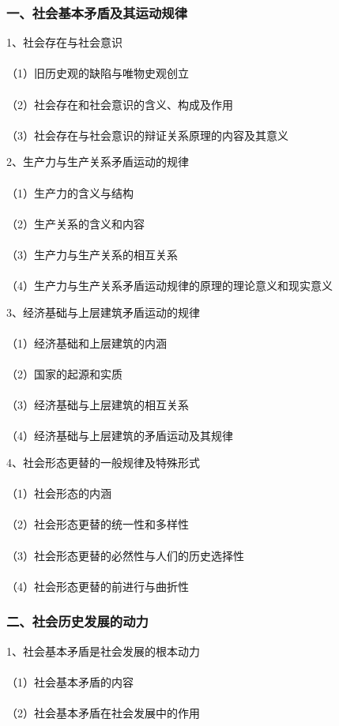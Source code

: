 \documentclass{ctexart}
\begin{document}
\subsubsection{一、社会基本矛盾及其运动规律}
1、社会存在与社会意识
\\\\
（1）旧历史观的缺陷与唯物史观创立
\\\\
（2）社会存在和社会意识的含义、构成及作用
\\\\
（3）社会存在与社会意识的辩证关系原理的内容及其意义

2、生产力与生产关系矛盾运动的规律
\\\\
（1）生产力的含义与结构
\\\\
（2）生产关系的含义和内容
\\\\
（3）生产力与生产关系的相互关系
\\\\
（4）生产力与生产关系矛盾运动规律的原理的理论意义和现实意义

3、经济基础与上层建筑矛盾运动的规律
\\\\
（1）经济基础和上层建筑的内涵
\\\\
（2）国家的起源和实质
\\\\
（3）经济基础与上层建筑的相互关系
\\\\
（4）经济基础与上层建筑的矛盾运动及其规律

4、社会形态更替的一般规律及特殊形式
\\\\
（1）社会形态的内涵
\\\\
（2）社会形态更替的统一性和多样性
\\\\
（3）社会形态更替的必然性与人们的历史选择性
\\\\
（4）社会形态更替的前进行与曲折性
\subsubsection{二、社会历史发展的动力}
1、社会基本矛盾是社会发展的根本动力
\\\\
（1）社会基本矛盾的内容
\\\\
（2）社会基本矛盾在社会发展中的作用
\end{document}
